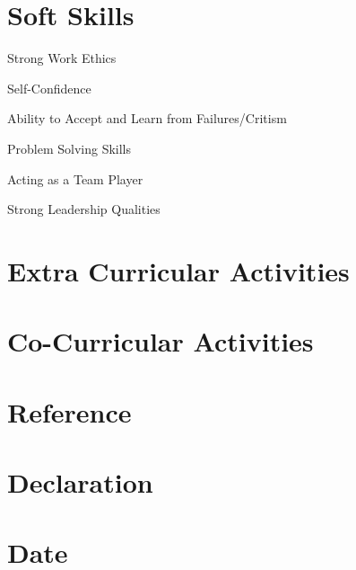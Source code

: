 \documentclass[11pt]{article}
\begin{document}
\section{Soft Skills}
\begin{description} 
\item{Strong Work Ethics}
\item {Self-Confidence}
\item {Ability to Accept and Learn from Failures/Critism}
\item {Problem Solving Skills}
\item {Acting as a Team Player}
\item {Strong Leadership Qualities}
\end{description}

\section{Extra Curricular Activities}
\section{Co-Curricular Activities}
\section{Reference}
\section{Declaration}
\section{Date}
\end{document}
